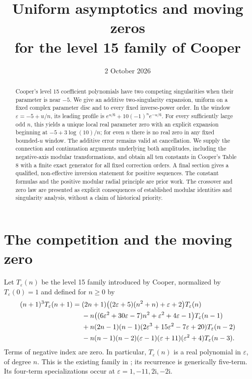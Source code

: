 \documentclass[11pt,letterpaper]{article}
\title{Uniform asymptotics and moving zeros\\for the level 15 family of Cooper}
\author{}
\date{2 October 2026}
\numberwithin{equation}{section}
\theoremstyle{definition}\newtheorem{definition}[theorem]{Definition}
\theoremstyle{remark}\newtheorem{remark}[theorem]{Remark}
\newcommand{\eps}{\varepsilon}
\newcommand{\ii}{\mathrm i}
\begin{document}
\maketitle
\vspace{-1.5em}
\begin{abstract}
Cooper's level 15 coefficient polynomials have two competing singularities when their parameter is near $-5$. We give an additive two-singularity expansion, uniform on a fixed complex parameter disc and to every fixed inverse-power order. In the window $\eps=-5+u/n$, its leading profile is $e^{u/6}+10(-1)^n e^{-u/6}$. For every sufficiently large odd $n$, this yields a unique local real parameter zero with an explicit expansion beginning at $-5+3\log(10)/n$; for even $n$ there is no real zero in any fixed bounded-$u$ window. The additive error remains valid at cancellation. We supply the connection and continuation arguments underlying both amplitudes, including the negative-axis modular transformations, and obtain all ten constants in Cooper's Table 8 with a finite exact generator for all fixed correction orders. A final section gives a qualified, non-effective inversion statement for positive sequences. The constant formulas and the positive modular radial principle are prior work. The crossover and zero law are presented as explicit consequences of established modular identities and singularity analysis, without a claim of historical priority.
\end{abstract}

\section{The competition and the moving zero}
\label{cmz:sec:main}
Let $T_\eps(n)$ be the level 15 family introduced by Cooper, normalized by $T_\eps(0)=1$ and defined for $n\geq0$ by
\begin{align}
(n+1)^3T_\eps(n+1)
={}&(2n+1)\bigl((2\eps+5)(n^2+n)+\eps+2\bigr)T_\eps(n)\notag\\
&-n\bigl((6\eps^2+30\eps-7)n^2+\eps^2+4\eps-1\bigr)T_\eps(n-1)\notag\\
&+n(2n-1)(n-1)(2\eps^3+15\eps^2-7\eps+20)T_\eps(n-2)\notag\\
&-n(n-1)(n-2)(\eps-1)(\eps+11)(\eps^2+4)T_\eps(n-3).
\label{cmz:eq:15rec}
\end{align}
Terms of negative index are zero. In particular, $T_\eps(n)$ is a real polynomial in $\eps$, of degree $n$. This is the existing family in \cite[Theorem 8.1 and (8.8)]{Cooper}; its recurrence is generically five-term. Its four-term specializations occur at $\eps=1,-11,2\ii,-2\ii$.
\end{document}
